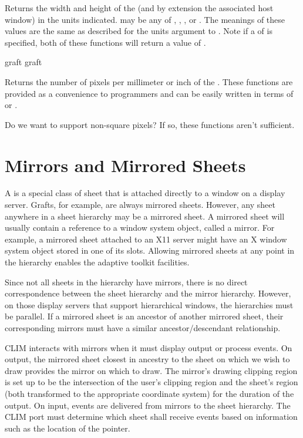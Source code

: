 Returns the width and height of the   (and by extension
the associated host window) in the units indicated.   may be any of
, , , or .  The
meanings of these values are the same as described for the units argument to
.  Note if a  of  is specified, both
of these functions will return a value of .

 {graft}
 {graft}

Returns the number of pixels per millimeter or inch of the 
.  These functions are provided as a convenience to programmers and
can be easily written in terms of  or .

 {Do we want to support non-square pixels?  If so, these functions
aren't sufficient.}


\section {Mirrors and Mirrored Sheets}

A  is a special class of sheet that is attached directly
to a window on a display server.  Grafts, for example, are always mirrored
sheets.  However, any sheet anywhere in a sheet hierarchy may be a mirrored
sheet.  A mirrored sheet will usually contain a reference to a window system
object, called a mirror.  For example, a mirrored sheet attached to an X11
server might have an X window system object stored in one of its slots.
Allowing mirrored sheets at any point in the hierarchy enables the adaptive
toolkit facilities.

Since not all sheets in the hierarchy have mirrors, there is no direct
correspondence between the sheet hierarchy and the mirror hierarchy.  However,
on those display servers that support hierarchical windows, the hierarchies must
be parallel.  If a mirrored sheet is an ancestor of another mirrored sheet,
their corresponding mirrors must have a similar ancestor/descendant
relationship.

CLIM interacts with mirrors when it must display output or process events.
On output, the mirrored sheet closest in ancestry to the sheet on which we wish
to draw provides the mirror on which to draw.  The mirror's drawing clipping
region is set up to be the intersection of the user's clipping region and the
sheet's region (both transformed to the appropriate coordinate system) for the
duration of the output.  On input, events are delivered from mirrors to the
sheet hierarchy.  The CLIM port must determine which sheet shall receive events
based on information such as the location of the pointer.

